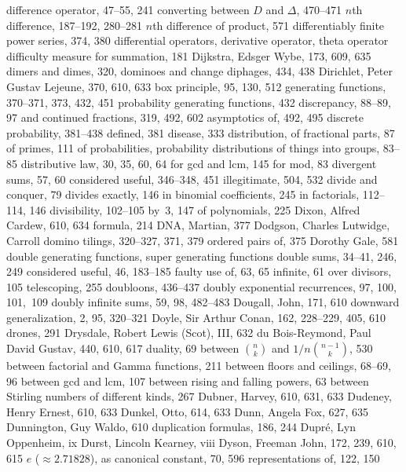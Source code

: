 difference operator, 47--55, 241
\sub converting between $D$ and $\Delta$, 470--471
\sub $n$th difference, 187--192, 280--281
\sub $n$th difference of product, 571
differentiably finite power series, 374, 380
differential operators, \see derivative operator, theta operator
difficulty measure for summation, 181
Dijkstra, Edsger Wybe, 173, 609, 635
dimers and dimes, 320, \see dominoes and change
diphages, 434, 438
Dirichlet, Peter Gustav Lejeune, 370, 610, 633
\sub box principle, 95, 130, 512
\sub generating functions, 370--371, 373, 432, 451
\sub probability generating functions, 432
discrepancy, 88--89, 97
\sub and continued fractions, 319, 492, 602
\sub asymptotics of, 492, 495
discrete probability, 381--438
\sub defined, 381
disease, 333
distribution,
\sub of fractional parts, 87
\sub of primes, 111
\sub of probabilities, \see probability distributions
\sub of things into groups, 83--85
distributive law, 30, 35, 60, 64
\sub for gcd and lcm, 145
\sub for mod, 83
divergent sums, 57, 60
\sub considered useful, 346--348, 451
\sub illegitimate, 504, 532
divide and conquer, 79
divides exactly,  146
\sub in binomial coefficients, 245
\sub in factorials, 112--114, 146
divisibility, 102--105
\sub by~$3$, 147
\sub of polynomials, 225
Dixon, Alfred Cardew, 610, 634
\sub formula, 214
DNA, Martian, 377
Dodgson, Charles Lutwidge, \see Carroll
domino tilings, 320--327, 371, 379
\sub ordered pairs of, 375
Dorothy Gale, 581
double generating functions, \see super generating functions
double sums, 34--41, 246, 249
\sub considered useful, 46, 183--185
\sub faulty use of, 63, 65
\sub infinite, 61
\sub over divisors, 105
\sub telescoping, 255
doubloons, 436--437
doubly exponential recurrences, 97, 100, 101,~109
doubly infinite sums, 59, 98, 482--483
Dougall, John, 171, 610
downward generalization, 2, 95, 320--321
Doyle, Sir Arthur Conan, 162, 228--229, 405, 610
drones, 291
Drysdale, Robert Lewis (Scot), III, 632
du Bois-Reymond, Paul David Gustav, 440, 610, 617
duality, 69
\sub between $n\choose k$ and $1/n{n-1\choose k}$, 530
\sub between factorial and Gamma functions, 211
\sub between floors and ceilings, 68--69, 96
\sub between gcd and lcm, 107
\sub between rising and falling powers, 63
\sub between Stirling numbers of different kinds, 267
Dubner, Harvey, 610, 631, 633
Dudeney, Henry Ernest, 610, 633
Dunkel, Otto, 614, 633
Dunn, Angela Fox, 627, 635
Dunnington, Guy Waldo, 610
duplication formulas, 186, 244
Dupr\'e, Lyn Oppenheim, ix
Durst, Lincoln Kearney, viii
Dyson, Freeman John, 172, 239, 610, 615
\medskip
$e$ ($\approx2.71828$),
\sub as canonical constant, 70, 596
\sub representations of, 122, 150
